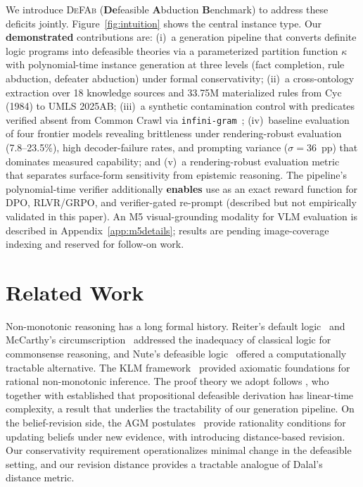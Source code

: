 \documentclass{article}
\theoremstyle{definition}
\newcommand{\partfunc}{\kappa}
\begin{document}
We introduce \textsc{DeFAb} (\textbf{De}feasible \textbf{A}bduction \textbf{B}enchmark) to address these deficits jointly. Figure~\ref{fig:intuition} shows the central instance type. Our \textbf{demonstrated} contributions are: (i)~a generation pipeline that converts definite logic programs into defeasible theories via a parameterized partition function $\partfunc$ with polynomial-time instance generation at three levels (fact completion, rule abduction, defeater abduction) under formal conservativity; (ii)~a cross-ontology extraction over 18 knowledge sources and 33.75M materialized rules from Cyc (1984) to UMLS 2025AB; (iii)~a synthetic contamination control with predicates verified absent from Common Crawl via \texttt{infini-gram}~\citep{liu2024infini}; (iv)~baseline evaluation of four frontier models revealing brittleness under rendering-robust evaluation (7.8--23.5\%), high decoder-failure rates, and prompting variance ($\sigma = 36$~pp) that dominates measured capability; and (v)~a rendering-robust evaluation metric that separates surface-form sensitivity from epistemic reasoning. The pipeline's polynomial-time verifier additionally \textbf{enables} use as an exact reward function for DPO, RLVR/GRPO, and verifier-gated re-prompt (described but not empirically validated in this paper). An M5 visual-grounding modality for VLM evaluation is described in Appendix~\ref{app:m5details}; results are pending image-coverage indexing and reserved for follow-on work.



\section{Related Work}\label{sec:related}

Non-monotonic reasoning has a long formal history. Reiter's default logic~\citep{reiter1980logic} and McCarthy's circumscription~\citep{mccarthy1980circumscription} addressed the inadequacy of classical logic for commonsense reasoning, and Nute's defeasible logic~\citep{nute1987defeasible, nute1994defeasible} offered a computationally tractable alternative. The KLM framework~\citep{kraus1990nonmonotonic} provided axiomatic foundations for rational non-monotonic inference. The proof theory we adopt follows \citet{antoniou2001defeasible}, who together with \citet{maher2001propositional} established that propositional defeasible derivation has linear-time complexity, a result that underlies the tractability of our generation pipeline. On the belief-revision side, the AGM postulates~\citep{alchourron1985logic, gardenfors1988knowledge} provide rationality conditions for updating beliefs under new evidence, with \citet{dalal1988investigations} introducing distance-based revision. Our conservativity requirement operationalizes minimal change in the defeasible setting, and our revision distance provides a tractable analogue of Dalal's distance metric.
\end{document}
